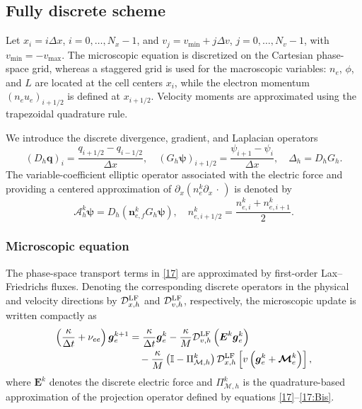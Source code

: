 \documentclass[pdflatex,final,10pt]{article}
\newcommand{\Del}[1]{#1}
\begin{document}
\subsection{Fully discrete scheme}

Let $x_i=i\Delta x$, $i=0,\ldots,N_x-1$, and
$v_j=v_{\min}+j\Delta v$, $j=0,\ldots,N_v-1$, with
$v_{\min}=-v_{\max}$. The microscopic equation is discretized on the Cartesian phase-space grid, whereas a staggered grid is used for the macroscopic variables: $n_e$,
$\phi$, and $L$ are located at the cell centers $x_i$, while the electron
momentum $(n_eu_e)_{i+1/2}$ is defined at $x_{i+1/2}$. Velocity moments are approximated using the trapezoidal quadrature rule.

We introduce the discrete divergence, gradient, and Laplacian operators
\begin{equation*}
    (D_h\boldsymbol{q})_i
    =
    \frac{q_{i+1/2}-q_{i-1/2}}{\Delta x},
    \quad
    (G_h\boldsymbol{\psi})_{i+1/2}
    =
    \frac{\psi_{i+1}-\psi_i}{\Delta x},
    \quad
    \Delta_h=D_hG_h.
\end{equation*}
The variable-coefficient elliptic operator associated with the electric force and \Del{providing a centered approximation of $\partial_x(n_e^k\partial_x\,\cdot\,)$} is denoted by
\begin{equation*}
    \mathcal{A}_h^k\boldsymbol{\psi}
    =
    D_h\left(\boldsymbol{n}_{e,f}^kG_h\boldsymbol{\psi}\right),
    \quad
    n_{e,i+1/2}^k
    =
    \frac{n_{e,i}^k+n_{e,i+1}^k}{2}.
\end{equation*}
\subsubsection{Microscopic equation}

The phase-space transport terms in \eqref{17} are approximated by
first-order Lax--Friedrichs fluxes. Denoting the corresponding discrete
operators in the physical and velocity directions by
$\mathcal{D}_{x,h}^{\rm LF}$ and $\mathcal{D}_{v,h}^{\rm LF}$,
respectively, the microscopic update is written compactly as
\begin{equation}
\begin{aligned}
    \left(\frac{\kappa}{\Delta t}+\nu_{ee}\right)
    \boldsymbol{g}_e^{k+1}
    &=
    \frac{\kappa}{\Delta t}\boldsymbol{g}_e^k
    -\frac{\kappa}{M}
    \mathcal{D}_{v,h}^{\rm LF}
    \left(\boldsymbol{E}^k\boldsymbol{g}_e^k\right)
    \\
    &\quad
    -\frac{\kappa}{M}
    \left(\mathbb{I}-\Pi_{\mathcal{M},h}^k\right)
    \mathcal{D}_{x,h}^{\rm LF}
    \left[
        v\left(\boldsymbol{g}_e^k+
        \boldsymbol{\mathcal{M}}_e^k\right)
    \right],
\end{aligned}
\label{eq:fully-discrete-micro}
\end{equation}
where $\boldsymbol{E}^k$ denotes the discrete electric force and
$\Pi_{\mathcal{M},h}^k$ is the quadrature-based approximation of the
projection operator \Del{defined by equations \eqref{17}--\eqref{17:Bis}}.
\end{document}
